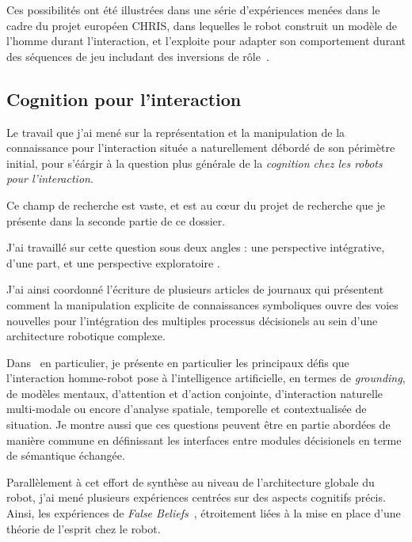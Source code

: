 \documentclass[a4paper]{article}
\begin{document}
Ces possibilités ont été illustrées dans une série d'expériences menées dans le
cadre du projet européen CHRIS, dans lequelles le robot construit un modèle de
l'homme durant l'interaction, et l'exploite pour adapter son comportement durant
des séquences de jeu includant des inversions de rôle~\cite{Lallee2010b,
Lallee2011, Lallee2012}.



\subsection{Cognition pour l'interaction%
  \label{cognition-for-interaction}%
}

Le travail que j'ai mené sur la représentation et la manipulation de la
connaissance pour l'interaction située a naturellement débordé de son périmètre
initial, pour s'éárgir à la question plus générale de la \emph{cognition chez
les robots pour l'interaction}.

Ce champ de recherche est vaste, et est au c\oe ur du projet de recherche que je
présente dans la seconde partie de ce dossier.

J'ai travaillé sur cette question sous deux angles : une perspective
intégrative, d'une part, et une perspective exploratoire .

J'ai ainsi coordonné l'écriture de plusieurs articles de journaux
\cite{alami2011when, Lemaignan2012, lemaignan2014human} qui présentent comment
la manipulation explicite de connaissances symboliques ouvre des voies nouvelles
pour l'intégration des multiples processus décisionels au sein d'une
architecture robotique complexe.

Dans~\cite{lemaignan2014human} en particulier, je présente en particulier les
principaux défis que l'interaction homme-robot pose à l'intelligence
artificielle, en termes de \emph{grounding}, de modèles mentaux, d'attention et
d'action conjointe, d'interaction naturelle multi-modale ou encore d'analyse
spatiale, temporelle et contextualisée de situation. Je montre aussi que ces
questions peuvent être en partie abordées de manière commune en définissant les
interfaces entre modules décisionels en terme de sémantique échangée.

Parallèlement à cet effort de synthèse au niveau de l'architecture globale du
robot, j'ai mené plusieurs expériences centrées sur des aspects cognitifs
précis. Ainsi, les expériences de \emph{False Beliefs}~\cite{Warnier2012a},
étroitement liées à la mise en place d'une théorie de l'esprit chez le robot.
\end{document}
